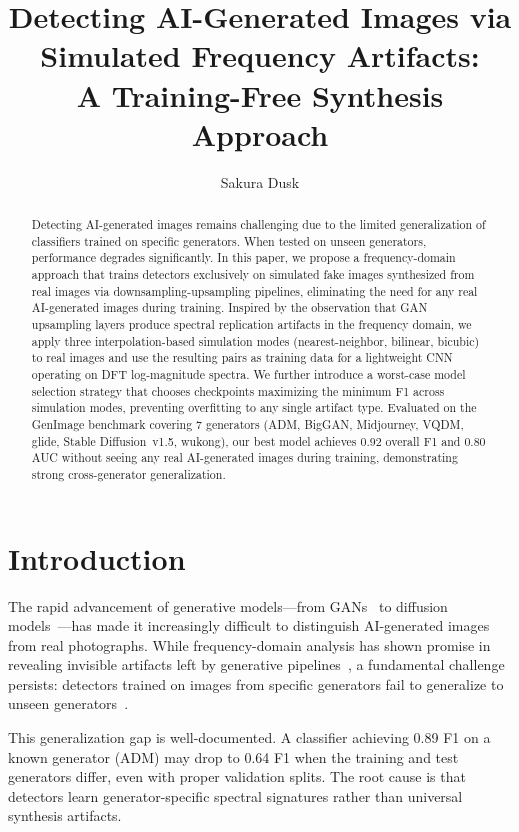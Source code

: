 \documentclass[11pt,a4paper]{article}
\title{\textbf{Detecting AI-Generated Images via Simulated Frequency Artifacts:\\A Training-Free Synthesis Approach}}
\author{Sakura Dusk}
\date{}
\begin{document}
\maketitle

\begin{abstract}
Detecting AI-generated images remains challenging due to the limited generalization of classifiers trained on specific generators. When tested on unseen generators, performance degrades significantly. In this paper, we propose a frequency-domain approach that trains detectors exclusively on simulated fake images synthesized from real images via downsampling-upsampling pipelines, eliminating the need for any real AI-generated images during training. Inspired by the observation that GAN upsampling layers produce spectral replication artifacts in the frequency domain, we apply three interpolation-based simulation modes (nearest-neighbor, bilinear, bicubic) to real images and use the resulting pairs as training data for a lightweight CNN operating on DFT log-magnitude spectra. We further introduce a worst-case model selection strategy that chooses checkpoints maximizing the minimum F1 across simulation modes, preventing overfitting to any single artifact type. Evaluated on the GenImage benchmark covering 7 generators (ADM, BigGAN, Midjourney, VQDM, glide, Stable Diffusion~v1.5, wukong), our best model achieves 0.92 overall F1 and 0.80 AUC without seeing any real AI-generated images during training, demonstrating strong cross-generator generalization.
\end{abstract}

\section{Introduction}

The rapid advancement of generative models---from GANs~\cite{goodfellow2014generative} to diffusion models~\cite{ho2020denoising, saharia2022photorealistic}---has made it increasingly difficult to distinguish AI-generated images from real photographs. While frequency-domain analysis has shown promise in revealing invisible artifacts left by generative pipelines~\cite{zhang2020detecting, frank2020leveraging}, a fundamental challenge persists: detectors trained on images from specific generators fail to generalize to unseen generators~\cite{zhu2023genimage}.

This generalization gap is well-documented. A classifier achieving 0.89 F1 on a known generator (ADM) may drop to 0.64 F1 when the training and test generators differ, even with proper validation splits. The root cause is that detectors learn generator-specific spectral signatures rather than universal synthesis artifacts.
\end{document}
